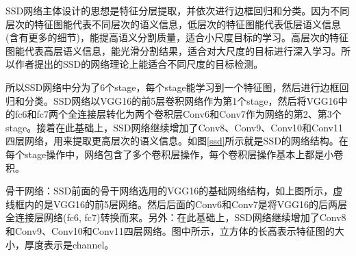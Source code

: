 SSD网络主体设计的思想是特征分层提取，并依次进行边框回归和分类。因为不同层次的特征图能代表不同层次的语义信息，低层次的特征图能代表低层语义信息(含有更多的细节)，能提高语义分割质量，适合小尺度目标的学习。高层次的特征图能代表高层语义信息，能光滑分割结果，适合对大尺度的目标进行深入学习。所以作者提出的SSD的网络理论上能适合不同尺度的目标检测。

所以SSD网络中分为了6个stage，每个stage能学习到一个特征图，然后进行边框回归和分类。SSD网络以VGG16的前5层卷积网络作为第1个stage，然后将VGG16中的fc6和fc7两个全连接层转化为两个卷积层Conv6和Conv7作为网络的第2、第3个stage。接着在此基础上，SSD网络继续增加了Conv8、Conv9、Conv10和Conv11四层网络，用来提取更高层次的语义信息。如图\ref{ssd}所示就是SSD的网络结构。在每个stage操作中，网络包含了多个卷积层操作，每个卷积层操作基本上都是小卷积。

骨干网络：SSD前面的骨干网络选用的VGG16的基础网络结构，如上图所示，虚线框内的是VGG16的前5层网络。然后后面的Conv6和Conv7是将VGG16的后两层全连接层网络(fc6, fc7)转换而来。另外：在此基础上，SSD网络继续增加了Conv8和Conv9、Conv10和Conv11四层网络。图中所示，立方体的长高表示特征图的大小，厚度表示是channel。

